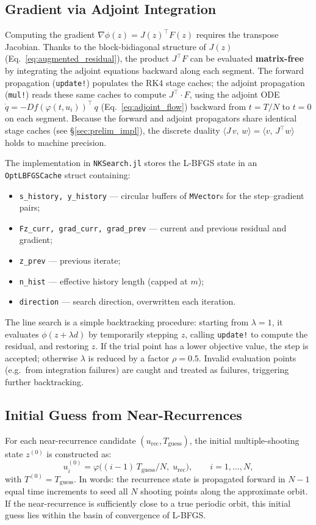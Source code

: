 \documentclass[11pt,a4paper]{article}
\begin{document}
\subsection{Gradient via Adjoint Integration}\label{sec:adjoint_impl}
Computing the gradient $\nabla\phi(z) = J(z)^\top F(z)$ requires the
transpose Jacobian.  Thanks to the block-bidiagonal structure
of $J(z)$ (Eq.~\ref{eq:augmented_residual}), the product $J^\top F$ can
be evaluated \textbf{matrix-free} by integrating the adjoint equations
backward along each segment.  The forward propagation (\texttt{update!})
populates the RK4 stage caches; the adjoint propagation (\texttt{mul!})
reads these same caches to compute $J^\top \cdot F$, using the adjoint ODE
$\dot{q} = -Df(\varphi(t, u_i))^\top\,q$ (Eq.~\ref{eq:adjoint_flow})
backward from $t = T/N$ to $t = 0$ on each segment.  Because the forward
and adjoint propagators share identical stage caches (see \S\ref{sec:prelim_impl}),
the discrete duality $\langle J\,v,\, w\rangle = \langle v,\, J^\top w\rangle$
holds to machine precision.

The implementation in \texttt{NKSearch.jl} stores the L-BFGS state in an
\texttt{OptLBFGSCache} struct containing:
\begin{itemize}[leftmargin=*]
  \item \texttt{s\_history, y\_history} --- circular buffers of
        \texttt{MVector}s for the step--gradient pairs;
  \item \texttt{Fz\_curr, grad\_curr, grad\_prev} --- current and previous
        residual and gradient;
  \item \texttt{z\_prev} --- previous iterate;
  \item \texttt{n\_hist} --- effective history length (capped at $m$);
  \item \texttt{direction} --- search direction, overwritten each iteration.
\end{itemize}
The line search is a simple backtracking procedure: starting from $\lambda=1$,
it evaluates $\phi(z + \lambda d)$ by temporarily stepping $z$, calling
\texttt{update!} to compute the residual, and restoring $z$.  If the trial
point has a lower objective value, the step is accepted; otherwise $\lambda$
is reduced by a factor $\rho = 0.5$.  Invalid evaluation points (e.g.\ from
integration failures) are caught and treated as failures, triggering further
backtracking.

\subsection{Initial Guess from Near-Recurrences}
For each near-recurrence candidate $(u_{\text{rec}}, T_{\text{guess}})$,
the initial multiple-shooting state $z^{(0)}$ is constructed as:
\begin{equation}
  u_i^{(0)} = \varphi\bigl((i-1)\,T_{\text{guess}} / N,\; u_{\text{rec}}\bigr),
  \qquad i = 1, \dots, N,
\end{equation}
with $T^{(0)} = T_{\text{guess}}$.  In words: the recurrence state is
propagated forward in $N-1$ equal time increments to seed all $N$ shooting
points along the approximate orbit.  If the near-recurrence is sufficiently
close to a true periodic orbit, this initial guess lies within the basin of
convergence of L-BFGS.
\end{document}
